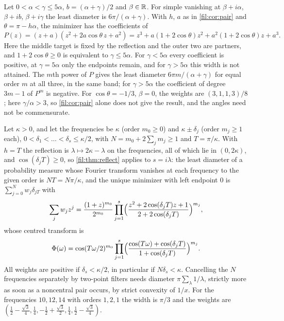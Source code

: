 \begin{example}\label{fil:cor:triple}
Let $0<\alpha<\gamma\le5\alpha$, $b=(\alpha+\gamma)/2$ and $\beta\in\mathbb{R}$. For simple vanishing at
$\beta+i\alpha$, $\beta+ib$, $\beta+i\gamma$ the least diameter is $6\pi/(\alpha+\gamma)$. With $h$, $a$ as in
\cref{fil:cor:pair} and $\theta=\pi-h\alpha$, the minimizer has the coefficients of
\[
 P(z)=(z+a)(z^2+2a\cos\theta\,z+a^2)=z^3+a(1+2\cos\theta)z^2+a^2(1+2\cos\theta)z+a^3 .
\]
Here the middle target is fixed by the reflection and the outer two are partners, and
$1+2\cos\theta\ge0$ is equivalent to $\gamma\le5\alpha$. For $\gamma<5\alpha$ every coefficient is
positive, at $\gamma=5\alpha$ only the endpoints remain, and for $\gamma>5\alpha$ this width is not
attained. The $m$th power of $P$ gives the least diameter $6\pi m/(\alpha+\gamma)$ for equal order $m$ at
all three, in the same band; for $\gamma>5\alpha$ the coefficient of degree $3m-1$ of $P^m$ is negative.
For $\cos\theta=-1/3$, $\beta=0$, the weights are $(3,1,1,3)/8$; here $\gamma/\alpha>3$, so
\cref{fil:cor:pair} alone does not give the result, and the angles need not be commensurate.
\end{example}

\begin{example}\label{fil:cor:cluster}
Let $\kappa>0$, and let the frequencies be $\kappa$ (order $m_0\ge0$) and $\kappa\pm\delta_j$ (order
$m_j\ge1$ each), $0<\delta_1<\dots<\delta_s\le\kappa/2$, with $N=m_0+2\sum_jm_j\ge1$ and $T=\pi/\kappa$.
With $h=T$ the reflection is $\lambda\mapsto2\kappa-\lambda$ on the frequencies, all of which lie in
$(0,2\kappa)$, and $\cos(\delta_jT)\ge0$, so \cref{fil:thm:reflect} applies to $s=i\lambda$: the least
diameter of a probability measure whose Fourier transform vanishes at each frequency to the given
order is $NT=N\pi/\kappa$, and the unique minimizer with left endpoint $0$ is
$\sum_{j=0}^Nw_j\delta_{jT}$ with
\[
 \sum_jw_jz^j=\frac{(1+z)^{m_0}}{2^{m_0}}\prod_{j=1}^s\Bigl(\frac{z^2+2\cos(\delta_jT)z+1}{2+2\cos(\delta_jT)}\Bigr)^{m_j},
\]
whose centred transform is
\[
 \Phi(\omega)=\cos(T\omega/2)^{m_0}\prod_{j=1}^s\Bigl(\frac{\cos(T\omega)+\cos(\delta_jT)}{1+\cos(\delta_jT)}\Bigr)^{m_j}.
\]
All weights are positive if $\delta_s<\kappa/2$, in particular if $N\delta_s<\kappa$. Cancelling the $N$
frequencies separately by two-point filters needs diameter $\pi\sum_\lambda1/\lambda$, strictly more as
soon as a noncentral pair occurs, by strict convexity of $1/x$. For the frequencies $10,12,14$ with
orders $1,2,1$ the width is $\pi/3$ and the weights are
$(\tfrac12-\tfrac{\sqrt3}4,\tfrac14,-\tfrac12+\tfrac{\sqrt3}2,\tfrac14,\tfrac12-\tfrac{\sqrt3}4)$.
\end{example}

